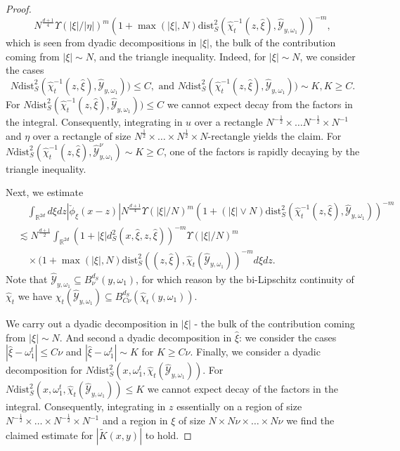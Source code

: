 \documentclass[10pt,a4paper]{amsart}
\newcommand{\R}{\mathbb{R}}
\begin{document}
\begin{proof}
\begin{equation*}
    N^{\frac{d+1}{4}} \Upsilon(|\xi|/|\eta|)^m (1+\max(|\xi|,N) \text{dist}_S^2(\hat{\chi}_t^{-1}(z,\hat{\xi}), \hat{\mathcal{Y}}_{y,\omega_1}))^{-m},
\end{equation*}
which is seen from dyadic decompositions in $|\xi|$, the bulk of the contribution coming from $|\xi| \sim N$, and the triangle inequality. Indeed, for $|\xi| \sim N$, we consider the cases
\begin{equation*}
    N \text{dist}_S^2(\hat{\chi}_t^{-1}(z,\hat{\xi}), \hat{\mathcal{Y}}_{y,\omega_1})) \leq C, \text{ and } N \text{dist}_S^2(\hat{\chi}_t^{-1}(z,\hat{\xi}), \hat{\mathcal{Y}}_{y,\omega_1})) \sim K, K \geq C.
\end{equation*}
For $N \text{dist}_S^2(\hat{\chi}_t^{-1}(z,\hat{\xi}), \hat{\mathcal{Y}}_{y,\omega_1})) \leq C$ we cannot expect decay from the factors in the integral. Consequently, integrating in $u$ over a rectangle $N^{-\frac{1}{2}} \times \ldots N^{-\frac{1}{2}} \times N^{-1}$ and $\eta$ over a rectangle of size $N^{\frac{1}{2}} \times \ldots \times N^{\frac{1}{2}} \times N$-rectangle yields the claim.
For $N \text{dist}_S^2 (\hat{\chi}_t^{-1}(z,\hat{\xi}), \hat{\mathcal{Y}}^{\nu}_{y,\omega_1}) \sim K \geq C$, one of the factors is rapidly decaying by the triangle inequality.

Next, we estimate
\begin{equation*}
\begin{split}
    &\quad \int_{\R^{2d}} d\xi dz |\check{\phi}_{\xi}(x-z)| N^{\frac{d+1}{4}} \Upsilon(|\xi|/N)^m (1+ (|\xi| \vee N) \text{dist}_S^2(\hat{\chi}_t^{-1}(z,\hat{\xi}),\hat{\mathcal{Y}}_{y,\omega_1}))^{-m} \\
    &\lesssim N^{\frac{d+1}{2}} \int_{\R^{2d}} (1+|\xi| d_S^2(x,\hat{\xi},z,\hat{\xi}))^{-m} \Upsilon(|\xi|/N)^m \\
    &\quad \times (1+ \max(|\xi|,N) \text{dist}_S^2((z,\hat{\xi}),\hat{\chi}_t(\hat{\mathcal{Y}}_{y,\omega_1}))^{-m} d\xi dz.
\end{split}
\end{equation*}
Note that $\hat{\mathcal{Y}}_{y,\omega_1} \subseteq B_{\nu}^{d_S}(y,\omega_1)$, for which reason by the bi-Lipschitz continuity of $\hat{\chi}_t$ we have $\hat{\chi}_t(\hat{\mathcal{Y}}_{y,\omega_1}) \subseteq B_{C \nu}^{d_S}(\hat{\chi}_t(y,\omega_1))$. %

We carry out a dyadic decomposition in $|\xi|$ - the bulk of the contribution coming from $|\xi| \sim N$. And second a dyadic decomposition in $\hat{\xi}$: we consider the cases $|\hat{\xi} - \omega_1^t| \leq C \nu$ and $|\hat{\xi} - \omega_1^t| \sim K$ for $K \geq C \nu$. Finally, we consider a dyadic decomposition for $N \text{dist}_S^2(x,\omega_1^t,\hat{\chi}_t(\hat{\mathcal{Y}}_{y,\omega_1}))$. For $N \text{dist}_S^2(x,\omega_1^t,\hat{\chi}_t(\hat{\mathcal{Y}}_{y,\omega_1})) \leq K$ we cannot expect decay of the factors in the integral. Consequently, integrating in $z$ essentially on a region of size $N^{-\frac{1}{2}} \times \ldots \times N^{-\frac{1}{2}} \times N^{-1}$ and a region in $\xi$ of size $N \times N \nu \times \ldots \times N \nu$ we find the claimed estimate for $|\tilde{K}(x,y)|$ to hold.


\end{proof}
\end{document}
